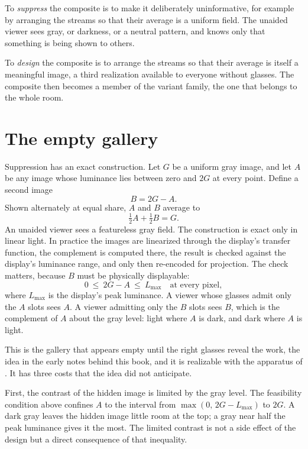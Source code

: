 To \emph{suppress} the composite is to make it deliberately uninformative, for example by arranging the streams so that their average is a uniform field. The unaided viewer sees gray, or darkness, or a neutral pattern, and knows only that something is being shown to others.

To \emph{design} the composite is to arrange the streams so that their average is itself a meaningful image, a third realization available to everyone without glasses. The composite then becomes a member of the variant family, the one that belongs to the whole room.

\section{The empty gallery}

Suppression has an exact construction. Let $G$ be a uniform gray image, and let $A$ be any image whose luminance lies between zero and $2G$ at every point. Define a second image
\begin{equation}
B=2G-A.
\end{equation}
Shown alternately at equal share, $A$ and $B$ average to
\begin{equation}
\tfrac12 A+\tfrac12 B=G.
\end{equation}
An unaided viewer sees a featureless gray field. The construction is exact only in linear light. In practice the images are linearized through the display's transfer function, the complement is computed there, the result is checked against the display's luminance range, and only then re-encoded for projection. The check matters, because $B$ must be physically displayable:
\begin{equation}
0\ \le\ 2G-A\ \le\ L_{\max}\quad\text{at every pixel},
\end{equation}
where $L_{\max}$ is the display's peak luminance. A viewer whose glasses admit only the $A$ slots sees $A$. A viewer admitting only the $B$ slots sees $B$, which is the complement of $A$ about the gray level: light where $A$ is dark, and dark where $A$ is light.

This is the gallery that appears empty until the right glasses reveal the work, the idea in the early notes behind this book, and it is realizable with the apparatus of . It has three costs that the idea did not anticipate.

First, the contrast of the hidden image is limited by the gray level. The feasibility condition above confines $A$ to the interval from $\max(0,\,2G-L_{\max})$ to $2G$. A dark gray leaves the hidden image little room at the top; a gray near half the peak luminance gives it the most. The limited contrast is not a side effect of the design but a direct consequence of that inequality.

